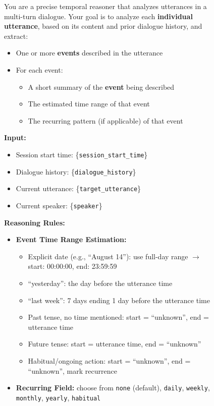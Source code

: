 \documentclass{article} %
\begin{document}
\begin{figure}[t]
\begin{tcolorbox}[
colframe=black!75!white,
colback=white, sharp corners,
boxrule=0.8pt, width=\textwidth,
title=Prompt for Event Extraction and Time Coverage Annotation
]

You are a precise temporal reasoner that analyzes utterances in a multi-turn dialogue.  
Your goal is to analyze each \textbf{individual utterance}, based on its content and prior dialogue history, and extract:

\begin{itemize}
    \item One or more \textbf{events} described in the utterance
    \item For each event:
    \begin{itemize}
        \item A short summary of the \textbf{event} being described 
        \item The estimated time range of that event  
        \item The recurring pattern (if applicable) of that event
    \end{itemize}
\end{itemize}

\textbf{Input:}
\begin{itemize}
    \item Session start time: \{\texttt{session\_start\_time}\}
    \item Dialogue history: \{\texttt{dialogue\_history}\}
    \item Current utterance: \{\texttt{target\_utterance}\}
    \item Current speaker: \{\texttt{speaker}\}
\end{itemize}

\textbf{Reasoning Rules:}
\begin{itemize}
    \item \textbf{Event Time Range Estimation:}
    \begin{itemize}
        \item Explicit date (e.g., ``August 14''): use full-day range  
              $\rightarrow$ start: 00:00:00, end: 23:59:59
        \item ``yesterday'': the day before the utterance time
        \item ``last week'': 7 days ending 1 day before the utterance time
        \item Past tense, no time mentioned: start = ``unknown'', end = utterance time
        \item Future tense: start = utterance time, end = ``unknown''
        \item Habitual/ongoing action: start = ``unknown'', end = ``unknown'', mark recurrence
    \end{itemize}
    \item \textbf{Recurring Field:} choose from \texttt{none} (default), \texttt{daily}, \texttt{weekly}, \texttt{monthly}, \texttt{yearly}, \texttt{habitual}
\end{itemize}


\end{tcolorbox}
\end{figure}
\end{document}
